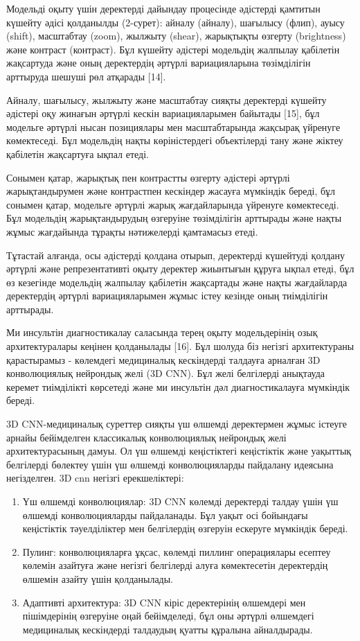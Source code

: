 \begin{multicols}{2}
Модельді оқыту үшін деректерді дайындау процесінде әдістерді қамтитын
күшейту әдісі қолданылды (2-сурет): айналу (айналу), шағылысу (флип),
ауысу (shift), масштабтау (zoom), жылжыту (shear), жарықтықты өзгерту
(brightness) және контраст (контраст). Бұл күшейту әдістері модельдің
жалпылау қабілетін жақсартуда және оның деректердің әртүрлі
вариацияларына төзімділігін арттыруда шешуші рөл атқарады {[}14{]}.

Айналу, шағылысу, жылжыту және масштабтау сияқты деректерді күшейту
әдістері оқу жинағын әртүрлі кескін вариацияларымен байытады {[}15{]},
бұл модельге әртүрлі нысан позициялары мен масштабтарында жақсырақ
үйренуге көмектеседі. Бұл модельдің нақты көріністердегі объектілерді
тану және жіктеу қабілетін жақсартуға ықпал етеді.

Сонымен қатар, жарықтық пен контрастты өзгерту әдістері әртүрлі
жарықтандырумен және контрастпен кескіндер жасауға мүмкіндік береді, бұл
сонымен қатар, модельге әртүрлі жарық жағдайларында үйренуге
көмектеседі. Бұл модельдің жарықтандырудың өзгеруіне төзімділігін
арттырады және нақты жұмыс жағдайында тұрақты нәтижелерді қамтамасыз
етеді.

Тұтастай алғанда, осы әдістерді қолдана отырып, деректерді күшейтуді
қолдану әртүрлі және репрезентативті оқыту деректер жиынтығын құруға
ықпал етеді, бұл өз кезегінде модельдің жалпылау қабілетін жақсартады
және нақты жағдайларда деректердің әртүрлі вариацияларымен жұмыс істеу
кезінде оның тиімділігін арттырады.

Ми инсультін диагностикалау саласында терең оқыту модельдерінің озық
архитектуралары кеңінен қолданылады {[}16{]}. Бұл шолуда біз негізгі
архитектураны қарастырамыз - көлемдегі медициналық кескіндерді талдауға
арналған 3D конволюциялық нейрондық желі (3D CNN). Бұл желі белгілерді
анықтауда керемет тиімділікті көрсетеді және ми инсультін дәл
диагностикалауға мүмкіндік береді.

3D CNN-медициналық суреттер сияқты үш өлшемді деректермен жұмыс істеуге
арнайы бейімделген классикалық конволюциялық нейрондық желі
архитектурасының дамуы. Ол үш өлшемді кеңістіктегі кеңістіктік және
уақыттық белгілерді бөлектеу үшін үш өлшемді конволюцияларды пайдалану
идеясына негізделген. 3D cnn негізгі ерекшеліктері:

\begin{enumerate}
\def\labelenumi{\arabic{enumi}.}
\item
  Үш өлшемді конволюциялар: 3D CNN көлемді деректерді талдау үшін үш
  өлшемді конволюцияларды пайдаланады. Бұл уақыт осі бойындағы
  кеңістіктік тәуелділіктер мен белгілердің өзгеруін ескеруге мүмкіндік
  береді.
\item
  Пулинг: конволюцияларға ұқсас, көлемді пиллинг операциялары есептеу
  көлемін азайтуға және негізгі белгілерді алуға көмектесетін
  деректердің өлшемін азайту үшін қолданылады.
\item
  Адаптивті архитектура: 3D CNN кіріс деректерінің өлшемдері мен
  пішімдерінің өзгеруіне оңай бейімделеді, бұл оны әртүрлі өлшемдегі
  медициналық кескіндерді талдаудың қуатты құралына айналдырады.
\end{enumerate}


\end{multicols}
